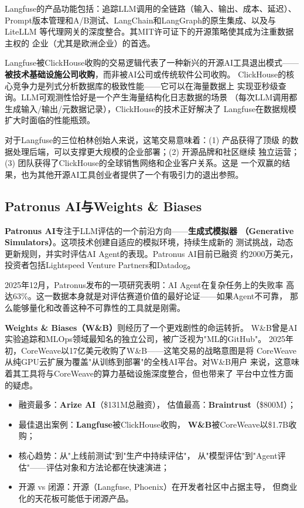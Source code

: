 Langfuse的产品功能包括：追踪LLM调用的全链路（输入、输出、成本、延迟）、
Prompt版本管理和A/B测试、LangChain和LangGraph的原生集成、以及与LiteLLM
等代理网关的深度整合。其MIT许可证下的开源策略使其成为注重数据主权的
企业（尤其是欧洲企业）的首选。

Langfuse被ClickHouse收购的交易逻辑代表了一种新兴的开源AI工具退出模式——
\textbf{被技术基础设施公司收购}，而非被AI公司或传统软件公司收购。
ClickHouse的核心竞争力是列式分析数据库的极致性能——它可以在海量数据上
实现亚秒级查询。LLM可观测性恰好是一个产生海量结构化日志数据的场景
（每次LLM调用都生成输入/输出/元数据记录），ClickHouse的技术正好解决了
Langfuse在数据规模扩大时面临的性能瓶颈。

对于Langfuse的三位柏林创始人来说，这笔交易意味着：(1) 产品获得了顶级
的数据处理后端，可以支撑更大规模的企业部署；(2) 开源品牌和社区继续
独立运营；(3) 团队获得了ClickHouse的全球销售网络和企业客户关系。这是
一个双赢的结果，也为其他开源AI工具创业者提供了一个有吸引力的退出参照。

\subsection{Patronus AI与Weights \& Biases}
\label{subsec:patronus-wandb}

\textbf{Patronus AI}专注于LLM评估的一个前沿方向——\textbf{生成式模拟器
（Generative Simulators）}。这项技术创建自适应的模拟环境，持续生成新的
测试挑战，动态更新规则，并实时评估AI Agent的表现。Patronus AI目前已融资
约2000万美元，投资者包括Lightspeed Venture Partners和Datadog。

2025年12月，Patronus发布的一项研究表明：AI Agent在复杂任务上的失败率
高达63\%。这一数据本身就是对评估赛道价值的最好论证——如果Agent不可靠，
那么能够量化和改善这种不可靠性的工具就是刚需。

\textbf{Weights \& Biases（W\&B）}则经历了一个更戏剧性的命运转折。
W\&B曾是AI实验追踪和MLOps领域最知名的独立公司，被广泛视为"ML的GitHub"。
2025年初，CoreWeave以17亿美元收购了W\&B——这笔交易的战略意图是将
CoreWeave从纯GPU云扩展为覆盖"从训练到部署"的全栈AI平台。对W\&B用户
来说，这意味着其工具将与CoreWeave的算力基础设施深度整合，但也带来了
平台中立性方面的疑虑。

\begin{corebox}[评估与可观测性赛道总结]
\begin{itemize}
  \item 融资最多：\textbf{Arize AI}（\$131M总融资），
    估值最高：\textbf{Braintrust}（\$800M）；
  \item 最佳退出案例：\textbf{Langfuse}被ClickHouse收购，
    \textbf{W\&B}被CoreWeave以\$1.7B收购；
  \item 核心趋势：从"上线前测试"到"生产中持续评估"，
    从"模型评估"到"Agent评估"——评估对象和方法论都在快速演进；
  \item 开源 vs 闭源：开源（Langfuse, Phoenix）在开发者社区中占据主导，
    但商业化的天花板可能低于闭源产品。
\end{itemize}
\end{corebox}

